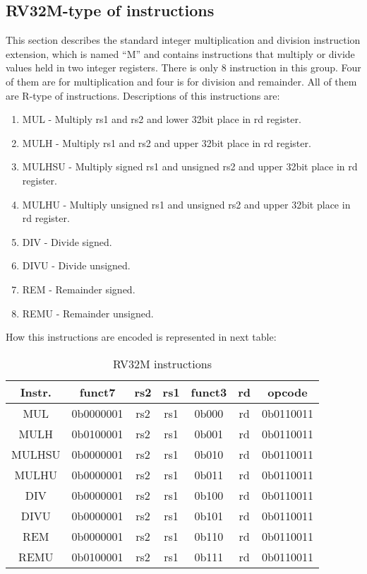 \documentclass{scrreprt}
\begin{document}
\newpage
\subsection*{RV32M-type of instructions}
This section describes the standard integer multiplication and division instruction extension, which
is named “M” and contains instructions that multiply or divide values held in two integer registers.
There is only 8 instruction in this group. Four of them are for multiplication and four is for division and remainder. All of them are R-type of instructions. 
\hfill \break
Descriptions of this instructions are:
\begin{enumerate}
        \item MUL - Multiply rs1 and rs2 and lower 32bit place in rd register.  
        \item MULH - Multiply rs1 and rs2 and upper 32bit place in rd register. 
        \item MULHSU - Multiply signed rs1 and unsigned rs2 and upper 32bit place in rd register. 
        \item MULHU - Multiply unsigned rs1 and unsigned rs2 and upper 32bit place in rd register.
        \item DIV - Divide signed. 
        \item DIVU - Divide unsigned. 
        \item REM - Remainder signed. 
        \item REMU - Remainder unsigned. 
\end{enumerate}

How this instructions are encoded is represented in next table:
\begin{table}[htb!]
        \centering
        \begin{tabular}{|c|c|c|c|c|c|c|} \hline 
             Instr. & funct7 & rs2 & rs1 & funct3 & rd & opcode\\ \hline 
             MUL & 0b0000001 & rs2 & rs1 & 0b000 & rd & 0b0110011\\ \hline 
             MULH & 0b0100001 & rs2 & rs1 & 0b001 & rd & 0b0110011\\ \hline 
             MULHSU & 0b0000001 & rs2 & rs1 & 0b010 & rd & 0b0110011\\ \hline 
             MULHU & 0b0000001 & rs2 & rs1 & 0b011 & rd & 0b0110011\\ \hline 
             DIV & 0b0000001 & rs2 & rs1 & 0b100 & rd & 0b0110011\\ \hline 
             DIVU & 0b0000001 & rs2 & rs1 & 0b101 & rd & 0b0110011\\ \hline 
             REM & 0b0000001 & rs2 & rs1 & 0b110 & rd & 0b0110011\\ \hline 
             REMU & 0b0100001 & rs2 & rs1 & 0b111 & rd & 0b0110011 \\ \hline  
        \end{tabular}
        \caption{RV32M instructions}
        \label{tab:tableRV32M}
    \end{table}
\newpage
\end{document}
